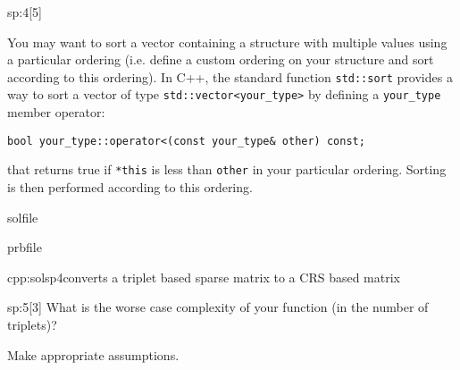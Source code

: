 \begin{samproblem}
\begin{subproblem}{sp:4}[5]
  \begin{samhint}
    You may want to sort a vector containing a structure with multiple values using a particular ordering 
		(i.e. define a custom ordering on your structure and sort according to this ordering). 
		In C++, the standard function \verb|std::sort| provides a way to sort a vector of type \verb|std::vector<your_type>| by defining a \verb|your_type| member operator:
    \begin{lstlisting}[style=cppsimple]
bool your_type::operator<(const your_type& other) const;
		\end{lstlisting}
  	that returns true if \verb|*this| is less than \verb|other| in your particular ordering. Sorting is then performed according to this ordering.
  \end{samhint}

  \begin{samwriteprbpart}{solfile}
    \begin{writeverbatim}{prbfile}
      \begin{samsolution}
			\begin{samcode}[C++-code]{cpp:solsp4}{converts a triplet based sparse matrix to a CRS based matrix}
			\small
			\end{samcode}
      \end{samsolution}
    \end{writeverbatim}
  \end{samwriteprbpart}


\end{subproblem}

\begin{subproblem}{sp:5}[3]
  What is the worse case complexity of your function (in the number of triplets)?
  
  \begin{samhint}
    Make appropriate assumptions.
  \end{samhint}
  

\end{subproblem}
\end{samproblem}
